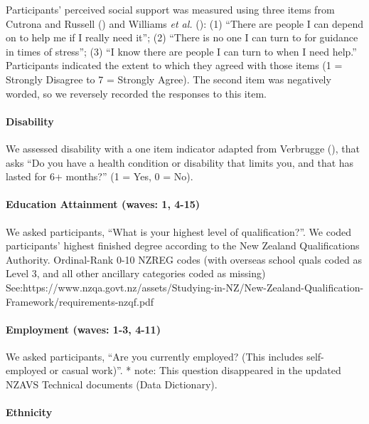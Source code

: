 \documentclass[
  single column]{article}
\let\oldparagraph\paragraph
\renewcommand{\paragraph}[1]{\oldparagraph{#1}\mbox{}}
\begin{document}
Participants' perceived social support was measured using three items
from Cutrona and Russell () and Williams
\emph{et al.} (): (1)
``There are people I can depend on to help me if I really need it''; (2)
``There is no one I can turn to for guidance in times of stress''; (3)
``I know there are people I can turn to when I need help.'' Participants
indicated the extent to which they agreed with those items (1 = Strongly
Disagree to 7 = Strongly Agree). The second item was negatively worded,
so we reversely recorded the responses to this item.

\paragraph{Disability}\label{disability}

We assessed disability with a one item indicator adapted from Verbrugge
(), that asks ``Do you have a health
condition or disability that limits you, and that has lasted for 6+
months?'' (1 = Yes, 0 = No).

\paragraph{Education Attainment (waves: 1,
4-15)}\label{education-attainment-waves-1-4-15}

We asked participants, ``What is your highest level of qualification?''.
We coded participants' highest finished degree according to the New
Zealand Qualifications Authority. Ordinal-Rank 0-10 NZREG codes (with
overseas school quals coded as Level 3, and all other ancillary
categories coded as missing)
See:https://www.nzqa.govt.nz/assets/Studying-in-NZ/New-Zealand-Qualification-Framework/requirements-nzqf.pdf

\paragraph{Employment (waves: 1-3,
4-11)}\label{employment-waves-1-3-4-11}

We asked participants, ``Are you currently employed? (This includes
self-employed or casual work)''. * note: This question disappeared in
the updated NZAVS Technical documents (Data Dictionary).

\paragraph{Ethnicity}\label{ethnicity}
\end{document}
